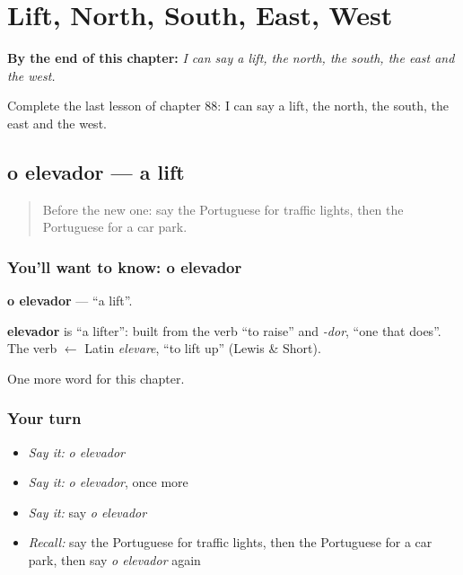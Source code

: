 
\chapter{Lift, North, South, East, West}
\label{ch:pt-lift-north-south-east-west}

\begin{chapteropening}
\textbf{By the end of this chapter:} \emph{I can say a lift, the north, the south, the east and the west.}

Complete the last lesson of chapter 88: I can say a lift, the north, the south, the east and the west.
\end{chapteropening}

\section[o elevador]{o elevador — a lift}

\label{lesson:PT-C88-elevador}



\begin{quote}
Before the new one: say the Portuguese for traffic lights, then the Portuguese for a car park.
\end{quote}

\subsection*{You'll want to know: o elevador}
\textbf{o elevador} — \textquotedblleft{}a lift\textquotedblright{}.

\begin{cousinweb}
\textbf{elevador} is \textquotedblleft{}a lifter\textquotedblright{}: built from the verb \textquotedblleft{}to raise\textquotedblright{} and \emph{-dor}, \textquotedblleft{}one that does\textquotedblright{}. The verb $\leftarrow$ Latin \emph{elevare}, \textquotedblleft{}to lift up\textquotedblright{} (Lewis \& Short).
\end{cousinweb}

\begin{grammarlens}[title={What you've built}]
One more word for this chapter.
\end{grammarlens}

\subsection*{Your turn}
\begin{itemize}
\raggedright
  \item \emph{Say it:} \emph{o elevador}
  \item \emph{Say it:} \emph{o elevador}, once more
  \item \emph{Say it:} say \emph{o elevador}
  \item \emph{Recall:} say the Portuguese for traffic lights, then the Portuguese for a car park, then say \emph{o elevador} again
\end{itemize}


